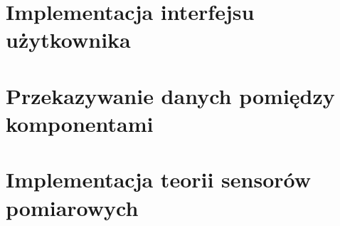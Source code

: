 \section{Implementacja interfejsu użytkownika}


\section{Przekazywanie danych pomiędzy komponentami}


\section{Implementacja teorii sensorów pomiarowych}
